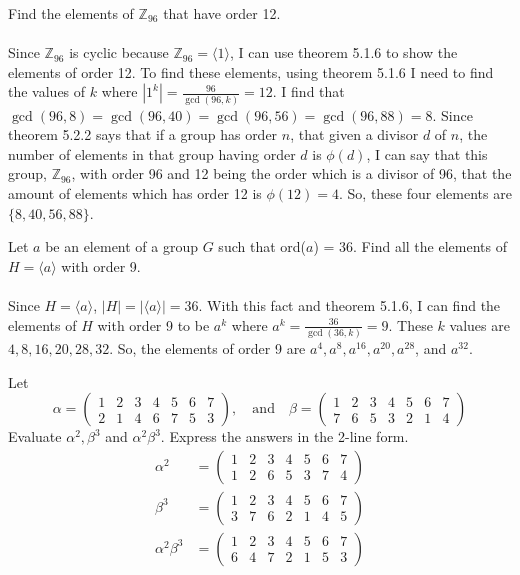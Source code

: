 \documentclass[titlepage]{article}
\newenvironment{problem}[2][Problem]{\begin{trivlist}
\item[\hskip \labelsep {\bfseries #1}\hskip \labelsep {\bfseries #2.}]}{\end{trivlist}}
\begin{document}
\begin{problem}{5}
Find the elements of $\mathbb{Z}_{96}$ that have order 12.
\\ \\
Since $\mathbb{Z}_{96}$ is cyclic because $\mathbb{Z}_{96} = \langle 1 \rangle$, I can use theorem 5.1.6 to show the elements of order 12. To find these elements, using theorem 5.1.6 I need to find the values of $k$ where $|1^k| = \frac{96}{\gcd(96,k)} = 12$. I find that $\gcd(96,8) = \gcd(96,40) = \gcd(96,56) = \gcd(96,88) = 8$. Since theorem 5.2.2 says that if a group has order $n$, that given a divisor $d$ of $n$, the number of elements in that group having order $d$ is $\phi(d)$, I can say that this group, $\mathbb{Z}_{96}$, with order 96 and 12 being the order which is a divisor of 96, that the amount of elements which has order 12 is $\phi(12) = 4$. So, these four elements are $\{8, 40, 56, 88\}$. 
\end{problem}
\begin{problem}{6}
Let $a$ be an element of a group $G$ such that ord($a$) = 36. Find all the elements of $H = \langle a \rangle$ with order 9.
\\ \\
Since $H = \langle a \rangle$, $|H| = |\langle a \rangle| = 36$. With this fact and theorem 5.1.6, I can find the elements of $H$ with order 9 to be $a^k$ where $a^k = \frac{36}{\gcd(36,k)} = 9$. These $k$ values are $4, 8, 16, 20, 28, 32$. So, the elements of order 9 are $a^4, a^8, a^{16}, a^{20}, a^{28}$, and $a^{32}$.
\end{problem}

\begin{problem}{7}
Let 
$$\alpha = \left(\begin{array}{ccccccc} 1 & 2 & 3 & 4 & 5 & 6 & 7 \\ 2 & 1 & 4 & 6 & 7 & 5 & 3\end{array}\right), \quad \text{and} \quad  \beta = \left(\begin{array}{ccccccc} 1 & 2 & 3 & 4 & 5 & 6 & 7 \\ 7 & 6 & 5 & 3 & 2 & 1 & 4 \end{array}\right)$$
Evaluate $\alpha^2, \beta^3 $ and $\alpha^2\beta^3.$ Express the answers in the 2-line form.
\begin{align*}
 \alpha^2 &= \left(\begin{array}{ccccccc} 1 & 2 & 3 & 4 & 5 & 6 & 7 \\ 1 & 2 & 6 & 5 & 3 & 7 & 4\end{array}\right) \\
\beta^3 &= \left(\begin{array}{ccccccc}1 & 2 & 3 & 4 & 5 & 6 & 7 \\ 3 & 7 & 6 &2 & 1 & 4 & 5 \end{array}\right) \\
 \alpha^2\beta^3 &= \left(\begin{array}{ccccccc}1 & 2 & 3 & 4 & 5 & 6 & 7 \\ 6 & 4 & 7 & 2 & 1 & 5 & 3 \end{array}\right)
 \end{align*}
 
\end{problem}
\end{document}
